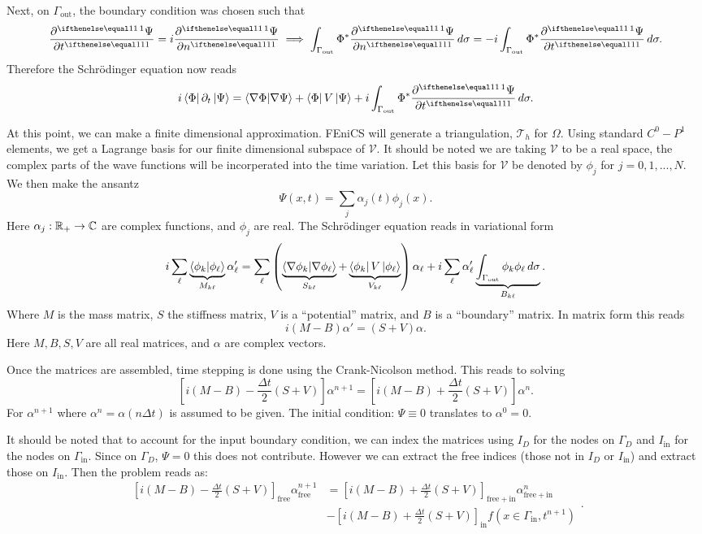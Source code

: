 \documentclass[../../main.tex]{subfiles}
\begin{document}
Next, on $\Gamma_\mathrm{out}$, the boundary condition was chosen 
such that 
\[
		\pder{\Psi}{t} = i \pder{\Psi}{n} \implies 
		\int_{\Gamma_\mathrm{out}} \Phi^* \pder{\Psi}{n} \, d\sigma = 
		-i \int_{\Gamma_\mathrm{out}} \Phi^* \pder{\Psi}{t} \, d\sigma
.\] 
Therefore the Schr\"odinger equation now reads
\[
		i \bra{\Phi} \partial_t \ket{\Psi} = 
		\bra{\nabla \Phi} \ket{\nabla \Psi} + 
		\bra{\Phi} V \ket{\Psi} + 
		i \int_{\Gamma_\mathrm{out}} \Phi^* \pder{\Psi}{t} \, d\sigma
.\] 

At this point, we can make a finite dimensional approximation.
FEniCS will generate a triangulation, $\mathcal T_h$ for 
$\Omega$.  
Using standard $C^0-P^1$ elements, 
we get a Lagrange basis for our finite dimensional subspace of 
$\mathcal V$.
It should be noted we are taking $\mathcal V$ to be a real space,
the complex parts of the wave functions will be incorperated into 
the time variation.
Let this basis for $\mathcal V$ be denoted by $\phi_j$ for $j = 0, 1, ..., N$. 
We then make the ansantz
\[
		\Psi(x, t) = \sum_j \alpha_j(t) \phi_j(x)
.\] 
Here $\alpha_j : \mathbb{R}_+ \to \mathbb{C}$ are complex functions, 
and $\phi_j$ are real.
The Schr\"odinger equation reads in variational form
\[
		i \sum_\ell 
		\underbrace{\bra{\phi_k} \ket{\phi_\ell}}_{M_{k\ell}} \alpha_\ell' = 
		\sum_\ell 
		\left(\underbrace{\bra{\nabla \phi_k} \ket{\nabla \phi_\ell}}_{
				S_{k\ell}} + 
		\underbrace{\bra{\phi_k} V \ket{\phi_\ell}}_{
			V_{k\ell}}\right) \alpha_\ell + 
		i \sum_\ell \alpha_\ell' 
		\underbrace{
				\int_{\Gamma_\mathrm{out}} \phi_k \phi_\ell 
		\, d\sigma}_{B_{k\ell}}
.\] 
Where $M$ is the mass matrix, $S$ the stiffness matrix,
$V$ is a ``potential'' matrix, and $B$ is a ``boundary'' matrix.
In matrix form this reads
\[
		i (M - B) \alpha' = (S + V) \alpha
.\]
Here $M, B, S, V$ are all real matrices, and $\alpha$ are complex vectors.

Once the matrices are assembled, time stepping is done using the 
Crank-Nicolson method.  
This reads to solving
\[
		\left[i (M - B) - \frac{\Delta t}{2} (S + V)\right] \alpha^{n+1} = 
		\left[i (M - B) + \frac{\Delta t}{2} (S + V) \right] \alpha^n
.\] 
For $\alpha^{n+1}$ where $\alpha^n = \alpha(n \Delta t)$ is assumed to
be given.
The initial condition: $\Psi \equiv 0$ translates to 
$\alpha^0 = 0$.

It should be noted that to account for the input boundary condition,
we can index the matrices using 
$I_D$ for the nodes on $\Gamma_D$ and 
$I_\mathrm{in}$ for the nodes on $\Gamma_\mathrm{in}$.
Since on $\Gamma_D$, $\Psi = 0$ this does not contribute.  
However we can extract the free indices (those not in $I_D$ or $I_\mathrm{in}$)
and extract those on $I_\mathrm{in}$.  
Then the problem reads as:
\[
  \begin{split}
		  \left[i (M - B) - \frac{\Delta t}{2} (S + V)\right]_\mathrm{free} 
		  \alpha^{n+1}_\mathrm{free}
		  & = \left[i(M - B) + \frac{\Delta t}{2} (S + V)\right]_\mathrm{
		  free + in} \alpha^n_\mathrm{free + in} \\
		  & - \left[i(M - B) + \frac{\Delta t}{2} (S + V)\right]_\mathrm{in} 
		  f\left(x\in \Gamma_\mathrm{in}, t^{n+1}\right)
  \end{split}
.\] 
\end{document}
